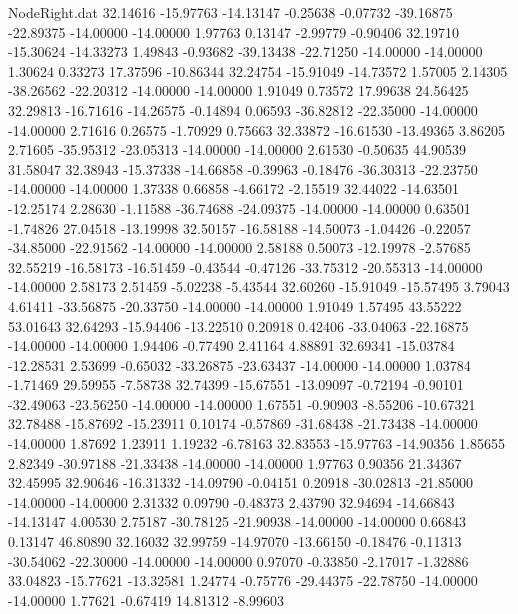 \begin{filecontents}{NodeRight.dat}
  32.14616  -15.97763  -14.13147    -0.25638   -0.07732  -39.16875  -22.89375  -14.00000  -14.00000    1.97763    0.13147   -2.99779   -0.90406
  32.19710  -15.30624  -14.33273     1.49843   -0.93682  -39.13438  -22.71250  -14.00000  -14.00000    1.30624    0.33273   17.37596  -10.86344
  32.24754  -15.91049  -14.73572     1.57005    2.14305  -38.26562  -22.20312  -14.00000  -14.00000    1.91049    0.73572   17.99638   24.56425
  32.29813  -16.71616  -14.26575    -0.14894    0.06593  -36.82812  -22.35000  -14.00000  -14.00000    2.71616    0.26575   -1.70929    0.75663
  32.33872  -16.61530  -13.49365     3.86205    2.71605  -35.95312  -23.05313  -14.00000  -14.00000    2.61530   -0.50635   44.90539   31.58047
  32.38943  -15.37338  -14.66858    -0.39963   -0.18476  -36.30313  -22.23750  -14.00000  -14.00000    1.37338    0.66858   -4.66172   -2.15519
  32.44022  -14.63501  -12.25174     2.28630   -1.11588  -36.74688  -24.09375  -14.00000  -14.00000    0.63501   -1.74826   27.04518  -13.19998
  32.50157  -16.58188  -14.50073    -1.04426   -0.22057  -34.85000  -22.91562  -14.00000  -14.00000    2.58188    0.50073  -12.19978   -2.57685
  32.55219  -16.58173  -16.51459    -0.43544   -0.47126  -33.75312  -20.55313  -14.00000  -14.00000    2.58173    2.51459   -5.02238   -5.43544
  32.60260  -15.91049  -15.57495     3.79043    4.61411  -33.56875  -20.33750  -14.00000  -14.00000    1.91049    1.57495   43.55222   53.01643
  32.64293  -15.94406  -13.22510     0.20918    0.42406  -33.04063  -22.16875  -14.00000  -14.00000    1.94406   -0.77490    2.41164    4.88891
  32.69341  -15.03784  -12.28531     2.53699   -0.65032  -33.26875  -23.63437  -14.00000  -14.00000    1.03784   -1.71469   29.59955   -7.58738
  32.74399  -15.67551  -13.09097    -0.72194   -0.90101  -32.49063  -23.56250  -14.00000  -14.00000    1.67551   -0.90903   -8.55206  -10.67321
  32.78488  -15.87692  -15.23911     0.10174   -0.57869  -31.68438  -21.73438  -14.00000  -14.00000    1.87692    1.23911    1.19232   -6.78163
  32.83553  -15.97763  -14.90356     1.85655    2.82349  -30.97188  -21.33438  -14.00000  -14.00000    1.97763    0.90356   21.34367   32.45995
  32.90646  -16.31332  -14.09790    -0.04151    0.20918  -30.02813  -21.85000  -14.00000  -14.00000    2.31332    0.09790   -0.48373    2.43790
  32.94694  -14.66843  -14.13147     4.00530    2.75187  -30.78125  -21.90938  -14.00000  -14.00000    0.66843    0.13147   46.80890   32.16032
  32.99759  -14.97070  -13.66150    -0.18476   -0.11313  -30.54062  -22.30000  -14.00000  -14.00000    0.97070   -0.33850   -2.17017   -1.32886
  33.04823  -15.77621  -13.32581     1.24774   -0.75776  -29.44375  -22.78750  -14.00000  -14.00000    1.77621   -0.67419   14.81312   -8.99603

\end{filecontents}
